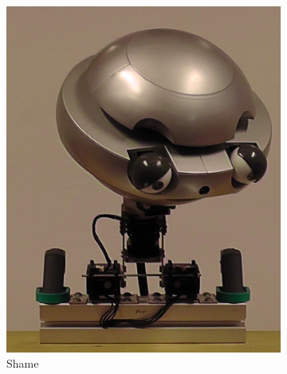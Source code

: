 \begin{figure}[ht]
\begin{subfigure}{0.2\columnwidth}
        \includegraphics[width=\columnwidth]{images/gbe/shame.jpg}
        \caption{Shame}
    \end{subfigure}
    \begin{subfigure}{0.2\columnwidth}

\end{subfigure}
\end{figure}
